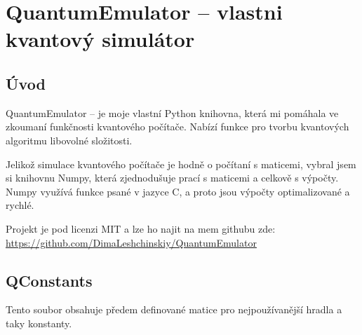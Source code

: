 \documentclass[11pt]{article}
\begin{document}
\section{QuantumEmulator – vlastni kvantový simulátor}
\label{sec:QuantumEmulator}
\subsection{Úvod}
QuantumEmulator – je moje vlastní Python knihovna, která mi pomáhala ve zkoumaní funkčnosti kvantového počítače.
Nabízí funkce pro tvorbu kvantových algoritmu libovolné složitosti.
\par Jelikož simulace kvantového počítače je hodně o počítaní s maticemi, vybral jsem si knihovnu Numpy, která zjednodušuje prací s maticemi a celkově s výpočty.
Numpy využívá funkce psané v jazyce C, a proto jsou výpočty optimalizované a rychlé.
\par Projekt je pod licenzi MIT a lze ho najit na mem githubu zde: \url{https://github.com/DimaLeshchinskiy/QuantumEmulator}

\subsection{QConstants}
Tento soubor obsahuje předem definované matice pro nejpoužívanější hradla a taky konstanty.
\end{document}
